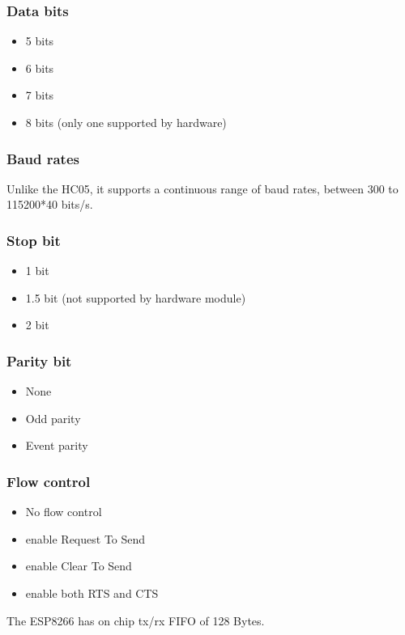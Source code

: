 \documentclass[11pt]{article}
\begin{document}
\subsubsection{Data bits}
\begin{itemize}
    \item 5 bits
    \item 6 bits
    \item 7 bits
    \item 8 bits (only one supported by hardware)
\end{itemize}
\subsubsection{Baud rates}
Unlike the HC05, it supports a continuous range of baud rates, between 300 to 115200*40 bits/s.

\subsubsection{Stop bit}
\begin{itemize}
    \item 1 bit
    \item 1.5 bit (not supported by hardware module)
    \item 2 bit
\end{itemize}

\subsubsection{Parity bit}
\begin{itemize}
    \item None
    \item Odd parity
    \item Event parity
\end{itemize}

\subsubsection{Flow control}
\begin{itemize}
    \item No flow control
    \item enable Request To Send
    \item enable Clear To Send
    \item enable both RTS and CTS
\end{itemize}

The ESP8266 has on chip tx/rx FIFO of 128 Bytes.
\end{document}
